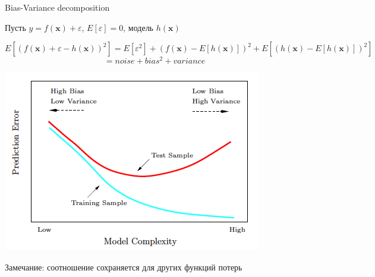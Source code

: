 \documentclass[aspectratio=169]{beamer}
\begin{document}
\begin{frame}{Bias-Variance decomposition}

Пусть $y = f(\mathbf{x}) + \varepsilon$, $E[\varepsilon] = 0$, модель $h(\mathbf{x})$

\[
E[(f(\mathbf{x}) + \varepsilon - h(\mathbf{x}))^2] = E[\varepsilon^2] + \left(f(\mathbf{x}) - E[h(\mathbf{x})]\right)^2 + E[(h(\mathbf{x}) -  E[h(\mathbf{x})])^2]
\]
\[
= noise + bias^2 + variance
\]

\begin{center}
\includegraphics[height=0.5\textheight]{images/bw.png}
\end{center}

Замечание: соотношение сохраняется для других функций потерь

\end{frame}
\end{document}
